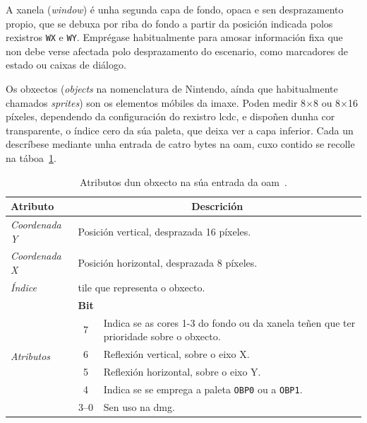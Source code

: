 A xanela (\textit{window}) é unha segunda capa de fondo, opaca e sen desprazamento
propio, que se debuxa por riba do fondo a partir da posición indicada polos rexistros
\texttt{WX} e \texttt{WY}. Emprégase habitualmente para amosar información fixa que non debe verse
afectada polo desprazamento do escenario, como marcadores de estado ou caixas de diálogo.

Os obxectos (\textit{objects} na nomenclatura de Nintendo, aínda que habitualmente chamados \textit{sprites})
son os elementos móbiles da imaxe.
Poden medir 8$\times$8 ou 8$\times$16 píxeles, dependendo da configuración do rexistro \acrshort{lcdc},
e dispoñen dunha cor transparente, o índice cero da súa paleta, que deixa ver a capa
inferior.
Cada un descríbese mediante unha entrada de catro bytes na \acrshort{oam}, cuxo contido
se recolle na táboa~\ref{tab:oam-entrada}.

\begin{table}[htbp]
  \centering
  \begin{tabular}{l|c|>{\raggedright\arraybackslash}p{6.5cm}}
  \rowcolor{udcpink!25}
  \textbf{Atributo} & \multicolumn{2}{c}{\textbf{Descrición}} \\\hline
  \rowcolor{udcgray!25}
  \textit{Coordenada Y} & \multicolumn{2}{l}{Posición vertical, desprazada 16 píxeles.} \\
  \textit{Coordenada X} & \multicolumn{2}{l}{Posición horizontal, desprazada 8 píxeles.} \\
  \rowcolor{udcgray!25}
  \textit{Índice}       & \multicolumn{2}{l}{\Gls{tile} que representa o obxecto.} \\\hline
  \multirow{6}{*}{\textit{Atributos}} & \textbf{Bit} & \\
                        & \cellcolor{udcgray!25} 7    & \cellcolor{udcgray!25} Indica se as cores 1-3 do fondo ou da xanela teñen que ter prioridade sobre o obxecto. \\
                        & 6                           & Reflexión vertical, sobre o eixo X. \\
                        & \cellcolor{udcgray!25} 5    & \cellcolor{udcgray!25} Reflexión horizontal, sobre o eixo Y. \\
                        & 4                           & Indica se se emprega a paleta \texttt{OBP0} ou a \texttt{OBP1}. \\
                        & \cellcolor{udcgray!25} 3--0 & \cellcolor{udcgray!25} Sen uso na \acrshort{dmg}. \\
  \end{tabular}
  \caption{Atributos dun obxecto na súa entrada da \acrshort{oam}~\cite{pandocs}.}
  \label{tab:oam-entrada}
\end{table}


